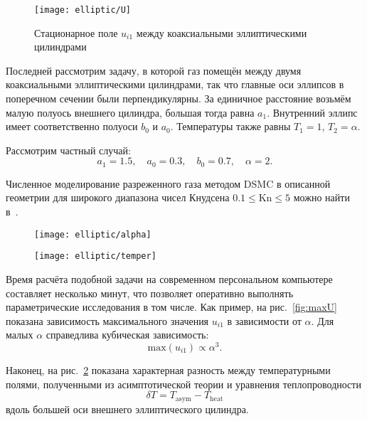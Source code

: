 \documentclass[english,russian,a4paper,10pt]{article}
\newcommand{\Kn}{\mathrm{Kn}}
\begin{document}
\begin{figure}
	\centering
	\texttt{[image: elliptic/U]}
	\caption{Стационарное поле \(u_{i1}\) между коаксиальными эллиптическими цилиндрами}
	\label{fig:elliptic}
\end{figure}

Последней рассмотрим задачу, в которой газ помещён между двумя коаксиальными эллиптическими цилиндрами,
так что главные оси эллипсов в поперечном сечении были перпендикулярны.
За единичное расстояние возьмём малую полуось внешнего цилиндра, большая тогда равна \(a_1\).
Внутренний эллипс имеет соответственно полуоси \(b_0\) и \(a_0\).
Температуры также равны \(T_1=1\), \(T_2=\alpha\).

Рассмотрим частный случай:
\[ a_1 = 1.5, \quad a_0 = 0.3, \quad b_0 = 0.7, \quad \alpha = 2.\]

Численное моделирование разреженного газа методом DSMC в описанной геометрии
для широкого диапазона чисел Кнудсена \(0.1\le\Kn\le5\) можно найти в~\cite{Sone1998}.

\begin{figure}[ht]
	\centering
	\begin{minipage}{.48\textwidth}
		\centering
		\texttt{[image: elliptic/alpha]}
		\label{fig:maxU}
	\end{minipage}
	\quad
	\begin{minipage}{.48\textwidth}
		\centering
		\texttt{[image: elliptic/temper]}
 		\vspace{-11pt}
		\label{fig:deltaT}
	\end{minipage}
\end{figure}

Время расчёта подобной задачи на современном персональном компьютере составляет несколько минут,
что позволяет оперативно выполнять параметрические исследования в том числе. Как пример,
на рис.~\ref{fig:maxU} показана зависимость максимального значения \(u_{i1}\) в зависимости от \(\alpha\).
Для малых \(\alpha\) справедлива кубическая зависимость:
\begin{equation}
	\mathrm{max}(u_{i1}) \propto \alpha^3.
\end{equation}

Наконец, на рис.~\ref{fig:deltaT} показана характерная разность между температурными полями,
полученными из асимптотической теории и уравнения теплопроводности
\[ \delta T = T_\mathrm{asym} - T_\mathrm{heat} \]
вдоль большей оси внешнего эллиптического цилиндра.
\end{document}
